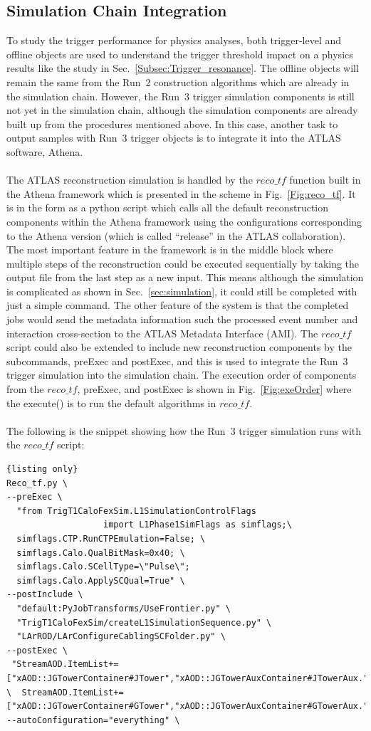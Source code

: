 \subsection{Simulation Chain Integration}
To study the trigger performance for physics analyses, both trigger-level and offline objects are used to understand the trigger threshold impact on a physics results like the study in Sec.~\ref{Subsec:Trigger_resonance}. The offline objects will remain the same from the Run~2 construction algorithms which are already in the simulation chain. However, the Run~3 trigger simulation components is still not yet in the simulation chain, although the simulation components are already built up from the procedures mentioned above. In this case, another task to output samples with Run~3 trigger objects is to integrate it into the ATLAS software, Athena.
\\
\\The ATLAS reconstruction simulation is handled by the $reco\_tf$ function built in the Athena framework which is presented in the scheme in Fig.~\ref{Fig:reco_tf}. It is in the form as a python script which calls all the default reconstruction components within the Athena framework using the configurations corresponding to the Athena version (which is called ``release'' in the ATLAS collaboration). The most important feature in the framework is in the middle block where multiple steps of the reconstruction could be executed sequentially by taking the output file from the last step as a new input. This means although the simulation is complicated as shown in Sec.~\ref{sec:simulation}, it could still be completed with just a simple command. The other feature of the system is that the completed jobs would send the metadata information such the processed event number and interaction cross-section to the ATLAS Metadata Interface (AMI). The $reco\_tf$ script could also be extended to include new reconstruction components by the subcommands, preExec and postExec, and this is used to integrate the Run~3 trigger simulation into the simulation chain. The execution order of components from the $reco\_tf$, preExec, and postExec is shown in Fig.~\ref{Fig:exeOrder} where the execute() is to run the default algorithms in $reco\_tf$. 
\\
\\The following is the snippet showing how the Run~3 trigger simulation runs with the $reco\_tf$ script:
\\
\begin{lstlisting}{listing only}
Reco_tf.py \
--preExec \
  "from TrigT1CaloFexSim.L1SimulationControlFlags 
                   import L1Phase1SimFlags as simflags;\ 
  simflags.CTP.RunCTPEmulation=False; \
  simflags.Calo.QualBitMask=0x40; \
  simflags.Calo.SCellType=\"Pulse\";
  simflags.Calo.ApplySCQual=True" \
--postInclude \
  "default:PyJobTransforms/UseFrontier.py" \
  "TrigT1CaloFexSim/createL1SimulationSequence.py" \
  "LArROD/LArConfigureCablingSCFolder.py" \
--postExec \
 "StreamAOD.ItemList+=["xAOD::JGTowerContainer#JTower","xAOD::JGTowerAuxContainer#JTowerAux."]; \  StreamAOD.ItemList+=["xAOD::JGTowerContainer#GTower","xAOD::JGTowerAuxContainer#GTowerAux."]";
--autoConfiguration="everything" \
\end{lstlisting}

